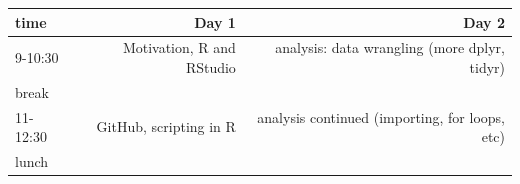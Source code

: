 \documentclass[]{book}
\theoremstyle{definition}
\theoremstyle{definition}
\theoremstyle{definition}
\theoremstyle{remark}
\begin{document}
\begin{longtable}[]{@{}lrr@{}}
\toprule
\begin{minipage}[b]{0.15\columnwidth}\raggedright\strut
time\strut
\end{minipage} & \begin{minipage}[b]{0.15\columnwidth}\raggedleft\strut
Day 1\strut
\end{minipage} & \begin{minipage}[b]{0.15\columnwidth}\raggedleft\strut
Day 2\strut
\end{minipage}\tabularnewline
\midrule
\endhead
\begin{minipage}[t]{0.15\columnwidth}\raggedright\strut
9-10:30\strut
\end{minipage} & \begin{minipage}[t]{0.15\columnwidth}\raggedleft\strut
Motivation, R and RStudio\strut
\end{minipage} & \begin{minipage}[t]{0.15\columnwidth}\raggedleft\strut
analysis: data wrangling (more dplyr, tidyr)\strut
\end{minipage}\tabularnewline
\begin{minipage}[t]{0.15\columnwidth}\raggedright\strut
break\strut
\end{minipage} & \begin{minipage}[t]{0.15\columnwidth}\raggedleft\strut
\strut
\end{minipage} & \begin{minipage}[t]{0.15\columnwidth}\raggedleft\strut
\strut
\end{minipage}\tabularnewline
\begin{minipage}[t]{0.15\columnwidth}\raggedright\strut
11-12:30\strut
\end{minipage} & \begin{minipage}[t]{0.15\columnwidth}\raggedleft\strut
GitHub, scripting in R\strut
\end{minipage} & \begin{minipage}[t]{0.15\columnwidth}\raggedleft\strut
analysis continued (importing, for loops, etc)\strut
\end{minipage}\tabularnewline
\begin{minipage}[t]{0.15\columnwidth}\raggedright\strut
lunch\strut
\end{minipage} & \begin{minipage}[t]{0.15\columnwidth}\raggedleft\strut
\strut
\end{minipage} & \begin{minipage}[t]{0.15\columnwidth}\raggedleft\strut

\end{minipage}
\end{longtable}
\end{document}
